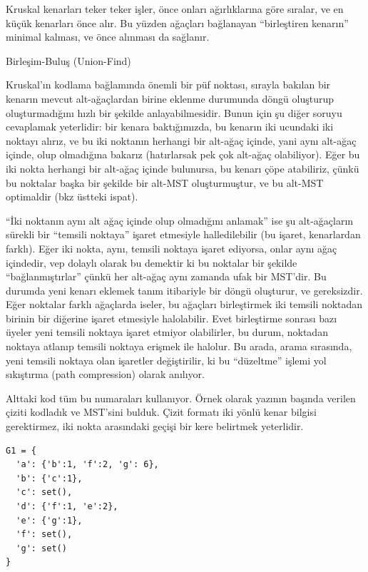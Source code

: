 \documentclass[12pt,fleqn]{article}\usepackage{../../common}
\begin{document}
Kruskal kenarları teker teker işler, önce onları ağırlıklarına göre
sıralar, ve en küçük kenarları önce alır. Bu yüzden ağaçları bağlanayan
``birleştiren kenarın'' minimal kalması, ve önce alınması da sağlanır.

Birleşim-Buluş (Union-Find)

Kruskal'ın kodlama bağlamında önemli bir püf noktası, sırayla bakılan bir
kenarın mevcut alt-ağaçlardan birine eklenme durumunda döngü oluşturup
oluşturmadığını hızlı bir şekilde anlayabilmesidir. Bunun için şu diğer
soruyu cevaplamak yeterlidir: bir kenara baktığımızda, bu kenarın iki
ucundaki iki noktayı alırız, ve bu iki noktanın herhangi bir alt-ağaç
içinde, yani aynı alt-ağaç içinde, olup olmadığına bakarız (hatırlarsak pek
çok alt-ağaç olabiliyor). Eğer bu iki nokta herhangi bir alt-ağaç içinde
bulunursa, bu kenarı çöpe atabiliriz, çünkü bu noktalar başka bir şekilde
bir alt-MST oluşturmuştur, ve bu alt-MST optimaldir (bkz üstteki ispat).

``İki noktanın aynı alt ağaç içinde olup olmadığını anlamak'' ise şu
alt-ağaçların sürekli bir ``temsili noktaya'' işaret etmesiyle
halledilebilir (bu işaret, kenarlardan farklı). Eğer iki nokta, aynı,
temsili noktaya işaret ediyorsa, onlar aynı ağaç içindedir, vep dolaylı
olarak bu demektir ki bu noktalar bir şekilde ``bağlanmıştırlar'' çünkü her
alt-ağaç aynı zamanda ufak bir MST'dir. Bu durumda yeni kenarı eklemek
tanım itibariyle bir döngü oluşturur, ve gereksizdir. Eğer noktalar farklı
ağaçlarda iseler, bu ağaçları birleştirmek iki temsili noktadan birinin bir
diğerine işaret etmesiyle halolabilir. Evet birleştirme sonrası bazı üyeler
yeni temsili noktaya işaret etmiyor olabilirler, bu durum, noktadan noktaya
atlanıp temsili noktaya erişmek ile halolur. Bu arada, arama sırasında,
yeni temsili noktaya olan işaretler değiştirilir, ki bu ``düzeltme'' işlemi
yol sıkıştırma (path compression) olarak anılıyor.

Alttaki kod tüm bu numaraları kullanıyor. Örnek olarak yazının başında
verilen çiziti kodladık ve MST'sini bulduk. Çizit formatı iki yönlü
kenar bilgisi gerektirmez, iki nokta arasındaki geçişi bir kere belirtmek
yeterlidir. 

\begin{verbatim}
G1 = {
  'a': {'b':1, 'f':2, 'g': 6},
  'b': {'c':1},
  'c': set(),
  'd': {'f':1, 'e':2},
  'e': {'g':1},
  'f': set(),
  'g': set()
}
\end{verbatim}
\end{document}
